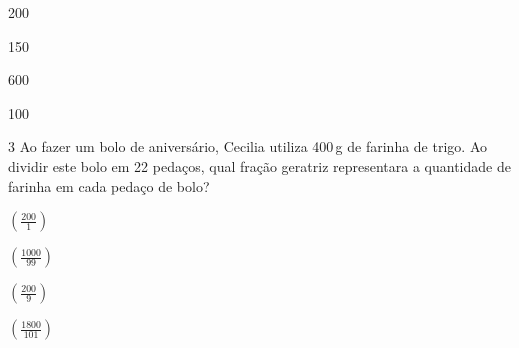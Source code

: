 \begin{escolha}
\item 200
\item 150
\item 600
\item 100
\end{escolha}









\num{3} Ao fazer um bolo de aniversário, Cecilia utiliza 400\,g de farinha de
trigo. Ao dividir este bolo em 22 pedaços, qual fração geratriz
representara a quantidade de farinha em cada pedaço de bolo?

\begin{escolha}
\item $(\frac{200}{1})$ 
\item $(\frac{1000}{99})$ 
\item $(\frac{200}{9})$ 
\item $(\frac{1800}{101})$ 
\end{escolha}







